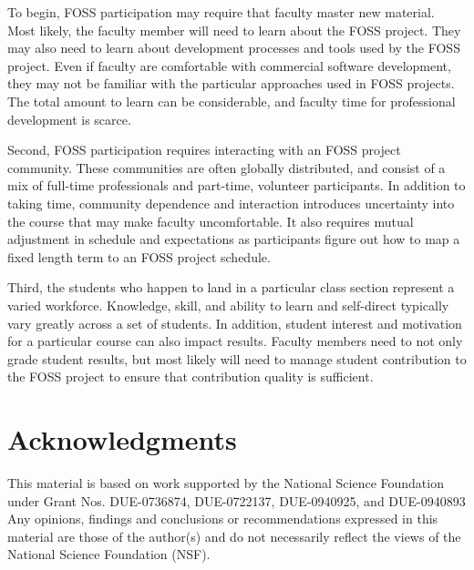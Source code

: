 \documentclass{sig-alternate}
\begin{document}
To begin, FOSS participation may require that faculty master new material.  Most likely, the faculty member will need to learn about the FOSS project.  They may also need to learn about development processes and tools used by the FOSS project.  Even if faculty are comfortable with commercial software development, they may not be familiar with the particular approaches used in FOSS projects.  The total amount to learn can be considerable, and faculty time for professional development is scarce.

Second, FOSS participation requires interacting with an FOSS project community.  These communities are often globally distributed, and consist of a mix of full-time professionals and part-time, volunteer participants.  In addition to taking time, community dependence and interaction introduces uncertainty into the course that may make faculty uncomfortable.  It also requires mutual adjustment in schedule and expectations as participants figure out how to map a fixed length term to an FOSS project schedule.

Third, the students who happen to land in a particular class section represent a varied workforce.  Knowledge, skill, and ability to learn and self-direct typically vary greatly across a set of students. In addition, student interest and motivation for a particular course can also impact results.  Faculty members need to not only grade student results, but most likely will need to manage student contribution to the FOSS project to ensure that contribution quality is sufficient.

    
\section{Acknowledgments}
This material is based on work supported by the National Science Foundation under Grant Nos. DUE-0736874, DUE-0722137, DUE-0940925, and DUE-0940893 Any opinions, findings and conclusions or recommendations expressed in this material are those of the author(s) and do not necessarily reflect the views of the National Science Foundation (NSF).
\end{document}
